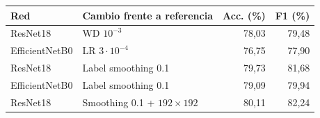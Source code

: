 \begin{tabular}{@{}llrr@{}}
\toprule
\textbf{Red} & \textbf{Cambio frente a referencia} & \textbf{Acc. (\%)} & \textbf{F1 (\%)} \\
\midrule
ResNet18 & WD $10^{-3}$ & 78,03 & 79,48 \\
EfficientNetB0 & LR $3\cdot10^{-4}$ & 76,75 & 77,90 \\
ResNet18 & Label smoothing 0.1 & 79,73 & 81,68 \\
EfficientNetB0 & Label smoothing 0.1 & 79,09 & 79,94 \\
ResNet18 & Smoothing 0.1 + $192\times192$ & 80,11 & 82,24 \\
\bottomrule
\end{tabular}
